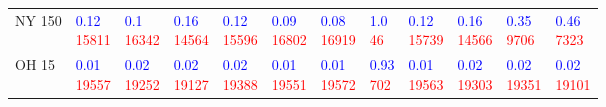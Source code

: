 \begin{tabular}{llllllllllll}
NY 150 &  \makecell{\textcolor{blue}{0.12} \\ \textcolor{red}{15811}} &   \makecell{\textcolor{blue}{0.1} \\ \textcolor{red}{16342}} &  \makecell{\textcolor{blue}{0.16} \\ \textcolor{red}{14564}} &  \makecell{\textcolor{blue}{0.12} \\ \textcolor{red}{15596}} &  \makecell{\textcolor{blue}{0.09} \\ \textcolor{red}{16802}} &  \makecell{\textcolor{blue}{0.08} \\ \textcolor{red}{16919}} &     \makecell{\textcolor{blue}{1.0} \\ \textcolor{red}{46}} &  \makecell{\textcolor{blue}{0.12} \\ \textcolor{red}{15739}} &  \makecell{\textcolor{blue}{0.16} \\ \textcolor{red}{14566}} &   \makecell{\textcolor{blue}{0.35} \\ \textcolor{red}{9706}} &   \makecell{\textcolor{blue}{0.46} \\ \textcolor{red}{7323}} \\
OH 15  &  \makecell{\textcolor{blue}{0.01} \\ \textcolor{red}{19557}} &  \makecell{\textcolor{blue}{0.02} \\ \textcolor{red}{19252}} &  \makecell{\textcolor{blue}{0.02} \\ \textcolor{red}{19127}} &  \makecell{\textcolor{blue}{0.02} \\ \textcolor{red}{19388}} &  \makecell{\textcolor{blue}{0.01} \\ \textcolor{red}{19551}} &  \makecell{\textcolor{blue}{0.01} \\ \textcolor{red}{19572}} &   \makecell{\textcolor{blue}{0.93} \\ \textcolor{red}{702}} &  \makecell{\textcolor{blue}{0.01} \\ \textcolor{red}{19563}} &  \makecell{\textcolor{blue}{0.02} \\ \textcolor{red}{19303}} &  \makecell{\textcolor{blue}{0.02} \\ \textcolor{red}{19351}} &  \makecell{\textcolor{blue}{0.02} \\ \textcolor{red}{19101}} \\

\end{tabular}
